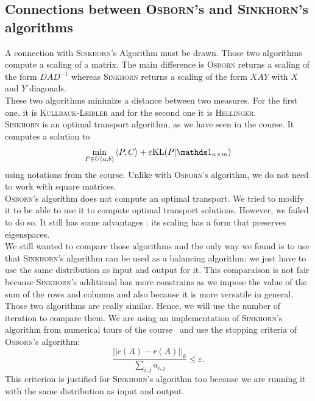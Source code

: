 \subsection{Connections between \textsc{Osborn}'s and \textsc{Sinkhorn}'s algorithms}

A connection with \textsc{Sinkhorn}'s Algorithm must be drawn. Those two algorithms compute a scaling of a matrix. The main difference is \textsc{Osborn} returns a scaling of the form \(D A D^{-1}\) whereas \textsc{Sinkhorn} returns a scaling of the form \(XAY\) with \(X\) and \(Y\) diagonals.\\

These two algorithms minimize a distance between two measures. For the first one, it is \textsc{Kullback-Leibler} and for the second one it is \textsc{Hellinger}.\\

\textsc{Sinkhorn} is an optimal transport algorithm, as we have seen in the course. It computes a solution to
\[
    \min_{P \in U(a,b)} \left\langle P, C\right\rangle + \varepsilon \text{KL}(P|\un_{n \times m})  
\]
using notations from the course. Unlike with \textsc{Osborn}'s algorithm, we do not need to work with square matrices.\\

\textsc{Osborn}'s algorithm does not compute an optimal transport. We tried to modify it to be able to use it to compute optimal transport solutions. However, we failed to do so. It still has some advantages : its scaling has a form that preserves eigenspaces.\\

We still wanted to compare those algorithms and the only way we found is to use that \textsc{Sinkhorn}'s algorithm can be used as a balancing algorithm: we just have to use the same distribution as input and output for it. This comparaison is not fair because \textsc{Sinkhorn}'s additional has more constrains as we impose the value of the sum of the rows and columns and also because it is more versatile in general.\\

Those two algorithms are really similar. Hence, we will use the number of iteration to compare them. We are using an implementation of \textsc{Sinkhorn}'s algorithm from numerical tours of the course~\cite{peyre2011numerical} and use the stopping criteria of \textsc{Osborn}'s algorithm:
\[
    \dfrac{||c(A) - r(A)||_k}{\sum_{i,j} a_{i,j}} \leq \varepsilon.
\]
This criterion is justified for \textsc{Sinkhorn}'s algorithm too because we are running it with the same distribution as input and output.\\

